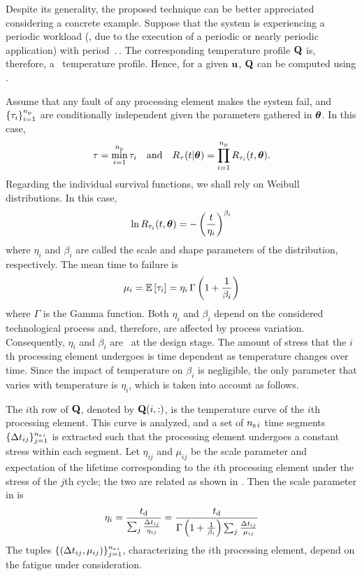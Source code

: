 Despite its generality, the proposed technique can be better appreciated considering a concrete example.
Suppose that the system is experiencing a periodic workload (\eg, due to the execution of a periodic or nearly periodic application) with period $\period$.
The corresponding temperature profile $\mQ$ is, therefore, a \dss\ temperature profile.
Hence, for a given $\vu$, $\mQ$ can be computed using .

Assume that any fault of any processing element makes the system fail, and $\{ \T_i \}_{i = 1}^\nprocs$ are conditionally independent given the parameters gathered in $\vwr$.
In this case,
\[
  \T = \min_{i = 1}^\nprocs \T_i \hspace{1em} \text{and} \hspace{1em} \survival_\T(\t | \vwr) = \prod_{i = 1}^\nprocs \survival_{\T_i}(\t, \vwr).
\]
Regarding the individual survival functions, we shall rely on Weibull distributions.
In this case,
\begin{equation} \elab{weibull-model}
  \ln \survival_{\T_i}(\t, \vwr) = -\left( \frac{\t}{\eta_i} \right)^{\beta_i}
\end{equation}
where $\eta_i$ and $\beta_i$ are called the scale and shape parameters of the distribution, respectively.
The mean time to failure is
\begin{equation} \elab{weibull-expectation}
  \mu_i = \expectation{\T_i} = \eta_i \, \Gamma\left(1 + \frac{1}{\beta_i}\right)
\end{equation}
where $\Gamma$ is the Gamma function.
Both $\eta_i$ and $\beta_i$ depend on the considered technological process and, therefore, are affected by process variation.
Consequently, $\eta_i$ and $\beta_i$ are \rvs\ at the design stage.
The amount of stress that the $i$th processing element undergoes is time dependent as temperature changes over time.
Since the impact of temperature on $\beta_i$ is negligible, the only parameter that varies with temperature is $\eta_i$, which is taken into account as follows.

The $i$th row of $\mQ$, denoted by $\mQ(i, :)$, is the temperature curve of the $i$th processing element.
This curve is analyzed, and a set of $\nsegments[i]$ time segments $\{ \dt_{ij} \}_{j = 1}^{\nsegments[i]}$ is extracted such that the processing element undergoes a constant stress within each segment.
Let $\eta_{ij}$ and $\mu_{ij}$ be the scale parameter and expectation of the lifetime corresponding to the $i$th processing element under the stress of the $j$th cycle; the two are related as shown in .
Then the scale parameter in  is \cite{xiang2010}
\begin{equation} \elab{compound-weibull-eta}
  \eta_i = \frac{\period}{\sum_j\frac{\dt_{ij}}{\eta_{ij}}} = \frac{\period}{\Gamma\left(1 + \frac{1}{\beta_i}\right) \sum_j\frac{\dt_{ij}}{\mu_{ij}}}
\end{equation}
The tuples $\{ (\dt_{ij}, \mu_{ij}) \}_{j = 1}^{\nsegments[i]}$, characterizing the $i$th processing element, depend on the fatigue under consideration.

